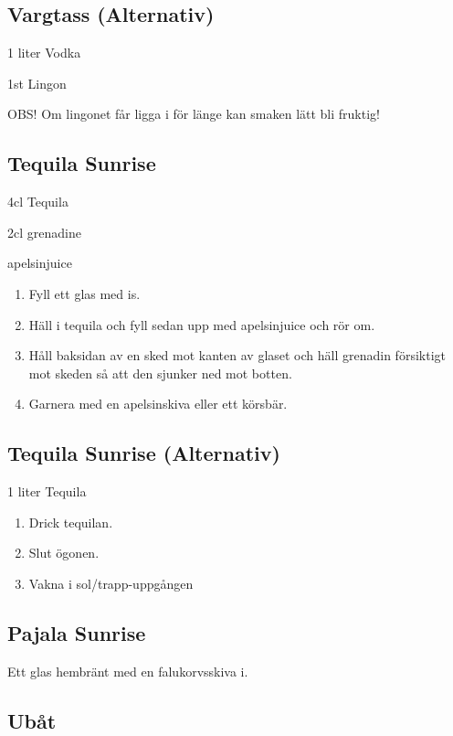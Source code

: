 \subsection{\textbf{Vargtass (Alternativ)}}

1 liter Vodka

1st Lingon

OBS! Om lingonet får ligga i för länge kan smaken lätt bli fruktig!
\filbreak
\subsection{\textbf{Tequila Sunrise}}

4cl Tequila

2cl grenadine

apelsinjuice

\begin{enumerate}
    \item Fyll ett glas med is.
    \item Häll i tequila och fyll sedan upp med apelsinjuice och rör om.
    \item Håll baksidan av en sked mot kanten av glaset och häll grenadin försiktigt mot skeden så att den sjunker ned mot botten.
    \item Garnera med en apelsinskiva eller ett körsbär.
\end{enumerate}
\filbreak
\subsection{\textbf{Tequila Sunrise (Alternativ)}}

1 liter Tequila

\begin{enumerate}
    \item Drick tequilan.
    \item Slut ögonen.
    \item Vakna i sol/trapp-uppgången
\end{enumerate}


\filbreak
\subsection{\textbf{Pajala Sunrise}}

Ett glas hembränt med en falukorvsskiva i.
\filbreak
\subsection{\textbf{Ubåt}}

